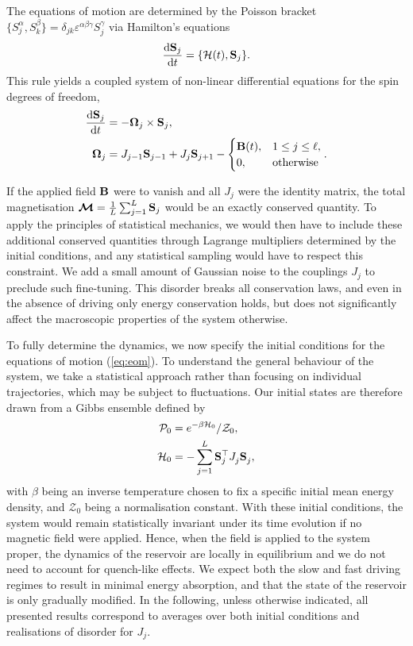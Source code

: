 \documentclass[aps,pre,twocolumn,notitlepage,floats,10pt]{revtex4-1}
\def\d{\mathrm{d}}
\def\ptop{{\vphantom\top}}
\newcommand{\be}{\begin{equation}}
\newcommand{\ee}{\end{equation}}
\newcommand{\beA}{\begin{equation}\begin{aligned}}
\newcommand{\eeA}{\end{aligned}\end{equation}}
\begin{document}
The equations of motion are determined by the Poisson bracket $\{
  S_j^\alpha, S_k^\beta \} = \delta_{jk} \varepsilon^{\alpha\beta\gamma}
  S_j^\gamma$ via Hamilton's equations
\be
\frac{\d {\bf S}_j}{\d t} = \{ \mathcal{H}(t), {\bf S}_j \}.
\ee
This rule yields a coupled system of non-linear differential equations for the spin
degrees of freedom,
\beA
\frac{\d {\bf S}_j}{\d t} &= - {\boldsymbol\Omega}_j \times {\bf S}_j, \\
{\boldsymbol\Omega}_j &= J_{j-1} {\bf S}_{j-1} + J_j {\bf S}_{j+1} -
\begin{cases}
  {\bf B}(t), & 1 \leq j \leq \ell, \\
  0,          & {\rm otherwise}\end{cases}
.
\label{eq:eom}
\eeA

If the applied field ${\bf B}$ were to vanish and all $J_j$ were the identity
matrix, the total magnetisation $\boldsymbol{\mathcal{M}} =
\frac{1}{L}\sum_{j=1}^L {\bf S}_j$ would be an exactly conserved quantity.
To apply the principles of statistical mechanics, we would then have to include
these additional conserved quantities through Lagrange multipliers determined by
the initial conditions, and any statistical sampling would have to respect this
constraint.
We add a small amount of Gaussian noise to the couplings $J_j$ to preclude such
fine-tuning. 
This disorder breaks all conservation laws, and even in the absence of driving
only energy conservation holds, but does not significantly affect the
macroscopic properties of the system otherwise.

To fully determine the dynamics, we now specify the initial conditions for the
equations of motion (\ref{eq:eom}).
To understand the general behaviour of the system, we take a statistical
approach rather than focusing on individual trajectories, which may be subject
to fluctuations.
Our initial states are therefore drawn from a Gibbs ensemble defined by
\beA
\mathcal{P}_0 &= e^{-\beta \mathcal{H}_0}/\mathcal{Z}_0, \\
\mathcal{H}_0 &= - \sum_{j=1}^L {\bf S}_j^\top J_j^\ptop {\bf S}_j^{\ptop} \label{eq:H0}
,
\eeA
with $\beta$ being an inverse temperature chosen to fix a specific initial mean
energy density, and $\mathcal{Z}_0$ being a normalisation constant.
With these initial conditions, the system would remain statistically invariant
under its time evolution if no magnetic field were applied.
Hence, when the field is applied to the system proper, the dynamics of the
reservoir are locally in equilibrium and we do not need to account for
quench-like effects.
We expect both the slow and fast driving regimes to result in minimal energy
absorption, and that the state of the reservoir is only gradually modified.
In the following, unless otherwise indicated, all presented results correspond to
averages over both initial conditions and realisations of disorder for $J_j$.
\end{document}
